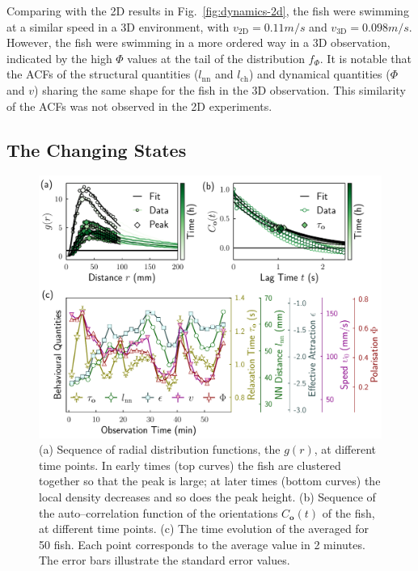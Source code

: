 \documentclass[11pt,twoside]{report}
\begin{document}
Comparing with the 2D results in Fig.~\ref{fig:dynamics-2d}, the fish were swimming at a similar speed in a 3D environment, with $v_\mathrm{2D} = 0.11m/s$ and $v_\mathrm{3D} = 0.098m/s$. However, the fish were swimming in a more ordered way in a 3D observation, indicated by the high $\Phi$ values at the tail of the distribution $f_\Phi$. 
It is notable that the ACFs of the structural quantities ($l_\mathrm{nn}$ and $l_\mathrm{ch}$) and dynamical quantities ($\Phi$ and $v$) sharing the same shape for the fish in the 3D observation. This similarity of the ACFs was not observed in the 2D experiments.



\subsection{The Changing States}
\label{section:change-states-3d}

\begin{figure}
  \includegraphics[width=\linewidth,outer]{change-states-3d-50}
  \caption[The changing states of 50 zebrafish in a 3D experiment]{
	(a) Sequence of radial distribution functions, the $g(r)$,  at different time points. In early times (top curves) the fish are clustered together so that the peak is large; at later times (bottom curves) the local density decreases and so does the peak height.
	(b) Sequence of the auto--correlation function of the orientations $C_\mathbf{o}(t)$ of the fish, at different time points.
	(c) The time evolution of the averaged {\descriptors} for 50 {\smallfish} fish. Each point corresponds to the average value in 2 minutes.
	The error bars illustrate the standard error values.
  }
  \label{fig:change-states-3d}
\end{figure}
\end{document}
